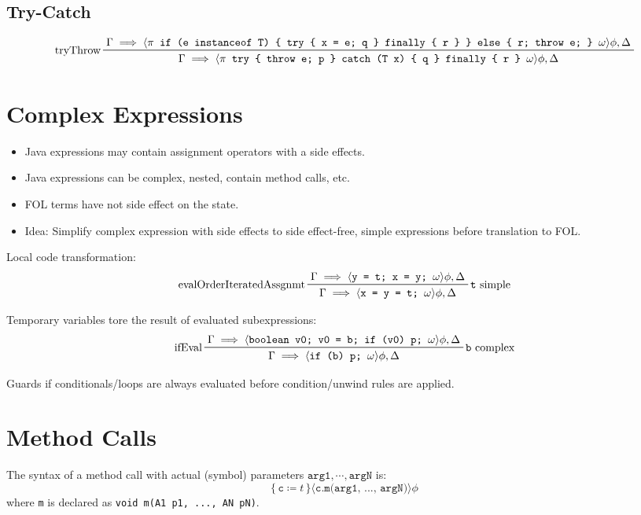 	\subsection{Try-Catch}
		{ \footnotesize \begin{equation*}
				\prftree[l]
				{tryThrow}
				{\Gamma \implies \langle \pi \texttt{ if (e instanceof T) \{ try \{ x = e; q \} finally \{ r \} \} else \{ r; throw e; \} } \omega \rangle \phi, \Delta}
				{\Gamma \implies \langle \pi \texttt{ try \{ throw e; p \} catch (T x) \{ q \} finally \{ r \} } \omega \rangle \phi, \Delta}
			\end{equation*} }

\section{Complex Expressions}
	\begin{itemize}
		\item Java expressions may contain assignment operators with a side effects.
		\item Java expressions can be complex, nested, contain method calls, etc.
		\item FOL terms have not side effect on the state.
		\item Idea: Simplify complex expression with side effects to side effect-free, simple expressions before translation to FOL.
	\end{itemize}

	Local code transformation:
	\begin{equation*}
		\prftree[l, r]
		{\texttt{t} simple}
		{evalOrderIteratedAssgnmt}
		{\Gamma \implies \langle \texttt{y = t; x = y; } \omega \rangle \phi, \Delta}
		{\Gamma \implies \langle \texttt{x = y = t; } \omega \rangle \phi, \Delta}
	\end{equation*}

	Temporary variables tore the result of evaluated subexpressions:
	\begin{equation*}
		\prftree[l, r]
		{\texttt{b} complex}
		{ifEval}
		{\Gamma \implies \langle \texttt{boolean v0; v0 = b; if (v0) p; } \omega \rangle \phi, \Delta}
		{\Gamma \implies \langle \texttt{if (b) p; } \omega \rangle \phi, \Delta}
	\end{equation*}

	Guards if conditionals/loops are always evaluated before condition/unwind rules are applied.

\section{Method Calls}
	The syntax of a method call with actual (symbol) parameters \( \texttt{arg1}, \cdots, \texttt{argN} \) is:
	\begin{equation*}
		\{\, \texttt{c} \coloneqq t \,\} \langle \texttt{c.m(arg1, ..., argN)} \rangle \phi
	\end{equation*}
	where \texttt{m} is declared as \texttt{void m(A1 p1, ..., AN pN)}.

